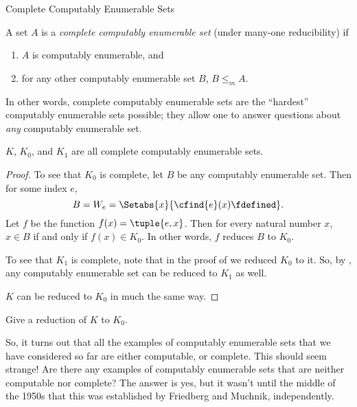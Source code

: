 \documentclass[../../../include/open-logic-section]{subfiles}
\begin{document}
  {Complete Computably Enumerable Sets}

\begin{defn}
A set $A$ is a \emph{complete computably enumerable set}
(under many-one reducibility) if
\begin{enumerate}
\item $A$ is computably enumerable, and
\item for any other computably enumerable set $B$, $B \leq_m A$.
\end{enumerate}
\end{defn}

In other words, complete computably enumerable sets are the
``hardest'' computably enumerable sets possible; they allow one to
answer questions about \emph{any} computably enumerable set.

\begin{thm}
$K$, $K_0$, and $K_1$ are all complete computably enumerable sets.
\end{thm}

\begin{proof}
To see that $K_0$ is complete, let $B$ be any computably
enumerable set. Then for some index $e$,
\[
B = W_e = \Setabs{x}{\cfind{e}(x) \fdefined}.
\]
Let $f$ be the function $f(x) = \tuple{e, x}$. Then for every natural
number $x$, $x \in B$ if and only if $f(x) \in K_0$. In other words, $f$
reduces $B$ to $K_0$.

To see that $K_1$ is complete, note that in the proof of
 we reduced $K_0$ to it. So, by
, any computably enumerable set can be
reduced to $K_1$ as well.

$K$ can be reduced to $K_0$ in much the same way.
\end{proof}

\begin{prob}
Give a reduction of $K$ to $K_0$.
\end{prob}

\begin{digress}
So, it turns out that all the examples of computably enumerable sets
that we have considered so far are either computable, or complete.
This should seem strange!{} Are there any examples of computably
enumerable sets that are neither computable nor complete? The answer
is yes, but it wasn't until the middle of the 1950s that this was
established by Friedberg and Muchnik, independently.
\end{digress}
\end{document}
